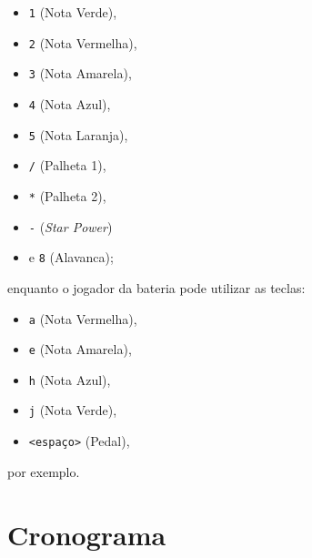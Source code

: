 \begin{itemize}
\itemsep1pt\parskip0pt
\item
  \texttt{1} (Nota Verde),
\item
  \texttt{2} (Nota Vermelha),
\item
  \texttt{3} (Nota Amarela),
\item
  \texttt{4} (Nota Azul),
\item
  \texttt{5} (Nota Laranja),
\item
  \texttt{/} (Palheta 1),
\item
  \texttt{*} (Palheta 2),
\item
  \texttt{-} (\emph{Star Power})
\item
  e \texttt{8} (Alavanca);
\end{itemize}

enquanto o jogador da bateria pode utilizar as teclas:

\begin{itemize}
\itemsep1pt\parskip0pt
\item
  \texttt{a} (Nota Vermelha),
\item
  \texttt{e} (Nota Amarela),
\item
  \texttt{h} (Nota Azul),
\item
  \texttt{j} (Nota Verde),
\item
  \texttt{\textless{}espaço\textgreater{}} (Pedal),
\end{itemize}

por exemplo.

\section{Cronograma}\label{cronograma}

